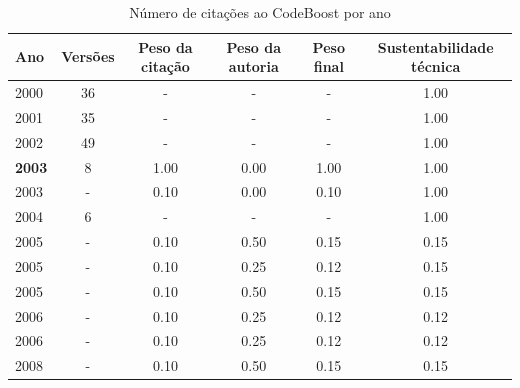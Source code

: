 \begin{table}[H]
\caption{Número de citações ao CodeBoost por ano}
\centering
\begin{tabular}{| l | c | c | c | c | c |}
  \hline
  Ano & Versões & Peso da citação & Peso da autoria & Peso final & Sustentabilidade técnica \\
  \hline
        2000 & 36 & - & - & -
        &
          {\color{blue} 1.00}
        \\
\hline
        2001 & 35 & - & - & -
        &
          {\color{blue} 1.00}
        \\
\hline
        2002 & 49 & - & - & -
        &
          {\color{blue} 1.00}
        \\
\hline
            {\bf 2003}
          &
          8
          &
          1.00
          &
          0.00
          &
          1.00
          &
            {\color{blue} 1.00}
          \\
            2003
          &
          -
          &
          0.10
          &
          0.00
          &
          0.10
          &
            {\color{blue} 1.00}
          \\
\hline
        2004 & 6 & - & - & -
        &
          {\color{blue} 1.00}
        \\
\hline
            2005
          &
          -
          &
          0.10
          &
          0.50
          &
          0.15
          &
            {\color{red} 0.15}
          \\
            2005
          &
          -
          &
          0.10
          &
          0.25
          &
          0.12
          &
            {\color{red} 0.15}
          \\
            2005
          &
          -
          &
          0.10
          &
          0.50
          &
          0.15
          &
            {\color{red} 0.15}
          \\
\hline
            2006
          &
          -
          &
          0.10
          &
          0.25
          &
          0.12
          &
            {\color{red} 0.12}
          \\
            2006
          &
          -
          &
          0.10
          &
          0.25
          &
          0.12
          &
            {\color{red} 0.12}
          \\
\hline
            2008
          &
          -
          &
          0.10
          &
          0.50
          &
          0.15
          &
            {\color{red} 0.15}
          \\

\end{tabular}
\end{table}
